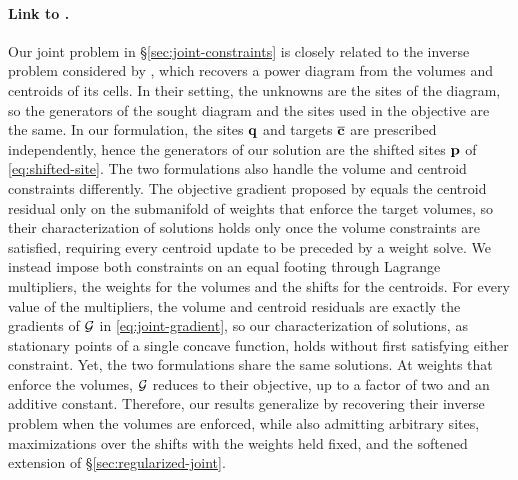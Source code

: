\documentclass[main.tex]{subfiles}
\begin{document}
\paragraph{Link to \citet{Bourne2025Inverting}.}
Our joint problem in \S\ref{sec:joint-constraints} is closely related to the inverse problem considered by \citet{Bourne2025Inverting}, which recovers a power diagram from the volumes and centroids of its cells.
In their setting, the unknowns are the sites of the diagram, so the generators of the sought diagram and the sites used in the objective are the same.
In our formulation, the sites $\mathbf{q}$ and targets $\overline{\mathbf{c}}$ are prescribed independently, hence the generators of our solution are the shifted sites $\mathbf{p}$ of \eqref{eq:shifted-site}.
% 
The two formulations also handle the volume and centroid constraints differently.
The objective gradient proposed by \citet{Bourne2025Inverting} equals the centroid residual only on the submanifold of weights that enforce the target volumes, so their characterization of solutions holds only once the volume constraints are satisfied, requiring every centroid update to be preceded by a weight solve.
We instead impose both constraints on an equal footing through Lagrange multipliers, the weights for the volumes and the shifts for the centroids.
For every value of the multipliers, the volume and centroid residuals are exactly the gradients of $\mathcal{G}$ in \eqref{eq:joint-gradient}, so our characterization of solutions, as stationary points of a single concave function, holds without first satisfying either constraint.
% 
Yet, the two formulations share the same solutions.
At weights that enforce the volumes, $\mathcal{G}$ reduces to their objective, up to a factor of two and an additive constant. %
Therefore, our results generalize \citet{Bourne2025Inverting} by recovering their inverse problem when the volumes are enforced, while also admitting arbitrary sites, maximizations over the shifts with the weights held fixed, and the softened extension of \S\ref{sec:regularized-joint}.
\end{document}
